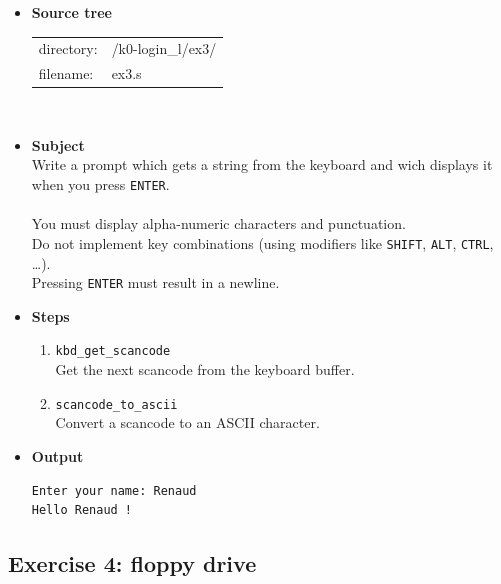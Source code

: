 \begin{itemize}
\item {\bf Source tree}\\
\begin{tabular}{p{4cm}l}
directory: & /k0-login\_l/ex3/\\
filename: & ex3.s
\end{tabular}
\\
\item {\bf Subject}\\
Write a prompt which gets a string from the keyboard and wich displays it when you press {\tt ENTER}.\\
\\
You must display alpha-numeric characters and punctuation.\\
Do not implement key combinations (using modifiers like {\tt SHIFT}, {\tt ALT}, {\tt CTRL}, \ldots).\\
Pressing {\tt ENTER} must result in a newline.\\
\item {\bf Steps}
  \begin{enumerate}
  \item {\tt kbd\_get\_scancode}\\
  Get the next scancode from the keyboard buffer.
  \item {\tt scancode\_to\_ascii}\\
  Convert a scancode to an ASCII character.
\\
  \end{enumerate}
\item {\bf Output}
\begin{verbatim}
Enter your name: Renaud
Hello Renaud !
\end{verbatim}
\end{itemize}

\newpage

\subsection*{Exercise 4: floppy drive}


